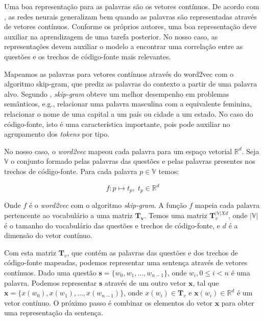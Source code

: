 Uma boa representação para as palavras são os vetores contínuos. De acordo com \cite{Goodfellow-et-al-2016}, as redes neurais generalizam bem quando as palavras são representadas através de vetores contínuos. Conforme os próprios autores, uma boa representação deve auxiliar na aprendizagem de uma tarefa posterior. No nosso caso, as representações devem auxiliar o modelo a encontrar uma correlação entre as questões e os trechos de código-fonte mais relevantes.

Mapeamos as palavras para vetores contínuos através do \gls{word2vec} com o algoritmo \gls{skip-gram}, que prediz as palavras do contexto a partir de uma palavra alvo. Segundo \cite{mikolov2013distributed}, \textit{skip-gram} obteve um melhor desempenho em problemas semânticos, e.g., relacionar uma palavra masculina com a equivalente feminina, relacionar o nome de uma capital a um país ou cidade a um estado. No caso do código-fonte, isto é uma característica importante, pois pode auxiliar no agrupamento dos \textit{tokens} por tipo. 

No nosso caso, o \textit{word2vec} mapeou cada palavra para um espaço vetorial $\mathbb{R}^{d}$. Seja $\mathbb{V}$ o conjunto formado pelas palavras das questões e pelas palavras presentes nos trechos de código-fonte. Para cada palavra ${p} \in \mathbb{V}$ temos:

\begin{equation}
    f: {p} \mapsto t_{p},\; t_{p} \in \mathbb{R}^{d}
\end{equation}

Onde $f$ é o \textit{word2vec} com o algoritmo \textit{skip-gram}. A função $f$ mapeia cada palavra pertencente ao vocabulário a uma matriz $\bm{T_{v}}$.
Temos uma matriz $\bm{T}_{v}^{|\mathbb{V}| X d}$, onde $|\mathbb{V}|$ é o tamanho do vocabulário das questões e trechos de código-fonte, e $d$ é a dimensão do vetor contínuo.

Com esta matriz $\bm{T}_{v}$, que contém as palavras das questões e dos trechos de código-fonte mapeadas, podemos representar uma sentença através de vetores contínuos. Dado uma questão $\bm{s} = \{ w_{0}, w_{1}, . . ., w_{n - 1}\}$, onde $w_{i}, 0 \leq i < n$ é uma palavra. Podemos representar $\bm{s}$ através de um outro vetor $\bm{x}$, tal que $\bm{x} = \{ x(w_{0}), x(w_{1}), . . ., x(w_{n - 1})\}$, onde $x(w_{i}) \in \bm{T}_{v}$ e $\bm{x}(w_{i}) \in \mathbb{R}^{d}$ é um vetor contínuo. O próximo passo é combinar os elementos do vetor $\bm{x}$ para obter uma representação da sentença.

